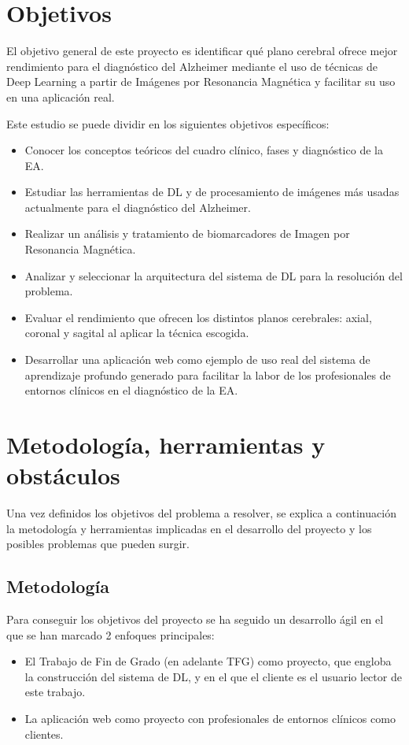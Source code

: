 \section{Objetivos}\label{sec:objetivos}
El objetivo general de este proyecto es identificar qué plano cerebral ofrece mejor rendimiento para el diagnóstico del
Alzheimer mediante el uso de técnicas de Deep Learning a partir de Imágenes por Resonancia Magnética y facilitar su uso
en una aplicación real.

Este estudio se puede dividir en los siguientes objetivos específicos:
\begin{itemize}
    \item Conocer los conceptos teóricos del cuadro clínico, fases y diagnóstico de la EA.
    \item Estudiar las herramientas de DL y de procesamiento de imágenes más usadas actualmente para el diagnóstico del
    Alzheimer.
    \item Realizar un análisis y tratamiento de biomarcadores de Imagen por Resonancia Magnética.
    \item Analizar y seleccionar la arquitectura del sistema de DL para la resolución del problema.
    \item Evaluar el rendimiento que ofrecen los distintos planos cerebrales: axial, coronal y sagital al aplicar la
    técnica escogida.
    \item Desarrollar una aplicación web como ejemplo de uso real del sistema de aprendizaje profundo generado para
    facilitar la labor de los profesionales de entornos clínicos en el diagnóstico de la EA.\\
\end{itemize}




\section{Metodología, herramientas y obstáculos}\label{sec:metodologia-herramientas-y-obstaculos}
Una vez definidos los objetivos del problema a resolver, se explica a continuación la metodología y herramientas
implicadas en el desarrollo del proyecto y los posibles problemas que pueden surgir.

\subsection{Metodología}\label{subsec:metodologia}
Para conseguir los objetivos del  proyecto se ha seguido un desarrollo ágil en el que se han marcado 2 enfoques
principales:
\begin{itemize}
    \item El Trabajo de Fin de Grado (en adelante \Gls{TFG}) como proyecto, que engloba la construcción del sistema de DL, y
    en el que el cliente es el usuario lector de este trabajo.
    \item La aplicación web como proyecto con profesionales de entornos clínicos como clientes.\\
\end{itemize}


